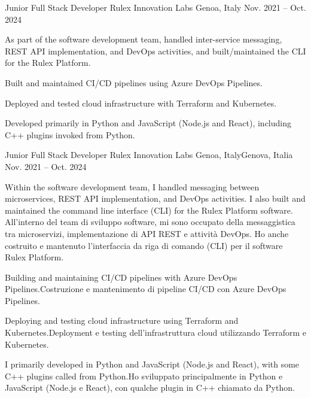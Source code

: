 \begin{cventries}
\ifenglish
\cventry
{Junior Full Stack Developer} %
{Rulex Innovation Labs} %
{Genoa, Italy} %
{Nov. 2021 -- Oct. 2024} %
{ %
\begin{cvitems}
  \item {As part of the software development team, handled inter-service messaging, REST API implementation, and DevOps activities, and built/maintained the CLI for the Rulex Platform.}
  \item {Built and maintained CI/CD pipelines using Azure DevOps Pipelines.}
  \item {Deployed and tested cloud infrastructure with Terraform and Kubernetes.}
  \item {Developed primarily in Python and JavaScript (Node.js and React), including C++ plugins invoked from Python.}
\end{cvitems}
}
\else
\cventry
{Junior Full Stack Developer} %
{Rulex Innovation Labs} %
{\ifenglish Genoa, Italy\else Genova, Italia\fi} %
{Nov. 2021 -- Oct. 2024} %
{ %
\begin{cvitems}
\item {\ifenglish 
    Within the software development team, I handled messaging between microservices, REST API implementation, and DevOps activities.
    I also built and maintained the command line interface (CLI) for the Rulex Platform software.
\else
    All'interno del team di sviluppo software, mi sono occupato della messaggistica tra microservizi, implementazione di API REST e attività DevOps.
    Ho anche costruito e mantenuto l'interfaccia da riga di comando (CLI) per il software Rulex Platform.
\fi}
\item {\ifenglish Building and maintaining CI/CD pipelines with Azure DevOps Pipelines.\else Costruzione e mantenimento di pipeline CI/CD con Azure DevOps Pipelines.\fi}
\item {\ifenglish Deploying and testing cloud infrastructure using Terraform and Kubernetes.\else Deployment e testing dell'infrastruttura cloud utilizzando Terraform e Kubernetes.\fi}
\item {\ifenglish I primarily developed in Python and JavaScript (Node.js and React), with some C++ plugins called from Python.\else Ho sviluppato principalmente in Python e JavaScript (Node.js e React), con qualche plugin in C++ chiamato da Python.\fi}
\end{cvitems}
}
\fi


\end{cventries}
